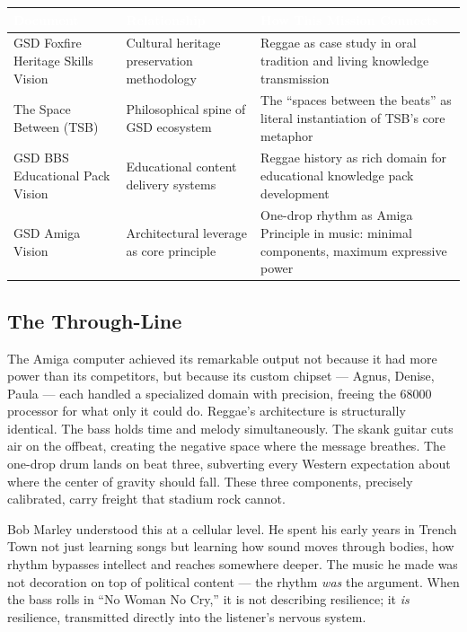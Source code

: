 \documentclass[11pt,letterpaper]{article}
\newcommand{\tableheader}[1]{\textbf{\sffamily\textcolor{white}{#1}}}
\begin{document}
\begin{center}
\begin{tabularx}{\textwidth}{L{4cm}L{5cm}L{4.5cm}}
\toprule
{}
\tableheader{Document} & \tableheader{Relationship} & \tableheader{How This Mission Connects} \\
\midrule
GSD Foxfire Heritage Skills Vision & Cultural heritage preservation methodology & Reggae as case study in oral tradition and living knowledge transmission \\
The Space Between (TSB) & Philosophical spine of GSD ecosystem & The ``spaces between the beats'' as literal instantiation of TSB's core metaphor \\
GSD BBS Educational Pack Vision & Educational content delivery systems & Reggae history as rich domain for educational knowledge pack development \\
GSD Amiga Vision & Architectural leverage as core principle & One-drop rhythm as Amiga Principle in music: minimal components, maximum expressive power \\
\bottomrule
\end{tabularx}
\end{center}

\subsection{The Through-Line}

The Amiga computer achieved its remarkable output not because it had more power than its competitors, but because its custom chipset --- Agnus, Denise, Paula --- each handled a specialized domain with precision, freeing the 68000 processor for what only it could do. Reggae's architecture is structurally identical. The bass holds time and melody simultaneously. The skank guitar cuts air on the offbeat, creating the negative space where the message breathes. The one-drop drum lands on beat three, subverting every Western expectation about where the center of gravity should fall. These three components, precisely calibrated, carry freight that stadium rock cannot.

Bob Marley understood this at a cellular level. He spent his early years in Trench Town not just learning songs but learning how sound moves through bodies, how rhythm bypasses intellect and reaches somewhere deeper. The music he made was not decoration on top of political content --- the rhythm \textit{was} the argument. When the bass rolls in ``No Woman No Cry,'' it is not describing resilience; it \textit{is} resilience, transmitted directly into the listener's nervous system.
\end{document}
